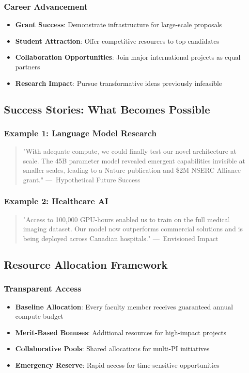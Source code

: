 \subsubsection{Career Advancement}
\begin{itemize}
\item \textbf{Grant Success}: Demonstrate infrastructure for large-scale proposals
\item \textbf{Student Attraction}: Offer competitive resources to top candidates
\item \textbf{Collaboration Opportunities}: Join major international projects as equal partners
\item \textbf{Research Impact}: Pursue transformative ideas previously infeasible
\end{itemize}

\subsection{Success Stories: What Becomes Possible}

\subsubsection{Example 1: Language Model Research}
\begin{quote}
"With adequate compute, we could finally test our novel architecture at scale. The 45B parameter model revealed emergent capabilities invisible at smaller scales, leading to a Nature publication and \$2M NSERC Alliance grant." 
---~Hypothetical Future Success
\end{quote}

\subsubsection{Example 2: Healthcare AI}
\begin{quote}
"Access to 100,000 GPU-hours enabled us to train on the full medical imaging dataset. Our model now outperforms commercial solutions and is being deployed across Canadian hospitals."
---~Envisioned Impact
\end{quote}

\subsection{Resource Allocation Framework}

\subsubsection{Transparent Access}
\begin{itemize}
\item \textbf{Baseline Allocation}: Every faculty member receives guaranteed annual compute budget
\item \textbf{Merit-Based Bonuses}: Additional resources for high-impact projects
\item \textbf{Collaborative Pools}: Shared allocations for multi-PI initiatives
\item \textbf{Emergency Reserve}: Rapid access for time-sensitive opportunities
\end{itemize}


